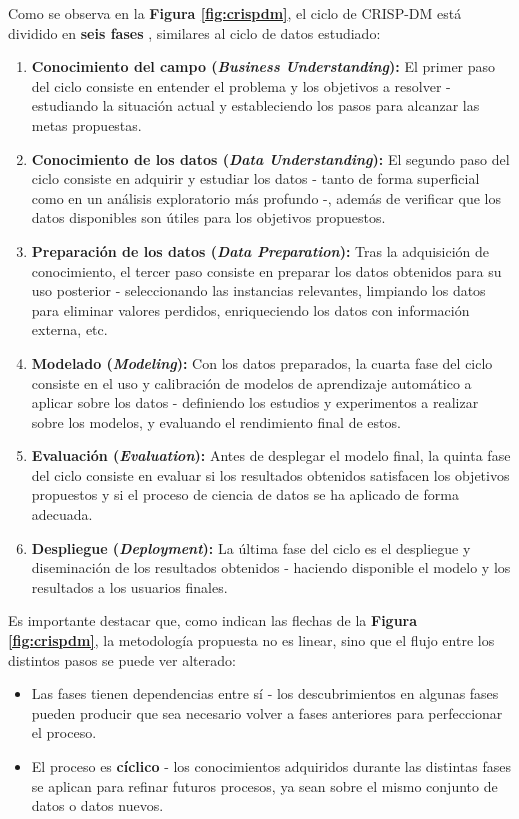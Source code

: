 Como se observa en la \textbf{Figura \ref{fig:crispdm}}, el ciclo de CRISP-DM está dividido en \textbf{seis fases} \cite{shearer2000crisp}, similares al ciclo de datos estudiado:

\begin{enumerate}[parsep=1pt, itemsep=1pt, topsep=4pt]
	\item \textbf{Conocimiento del campo (\textit{Business Understanding}):} El primer paso del ciclo consiste en entender el problema y los objetivos a resolver - estudiando la situación actual y estableciendo los pasos para alcanzar las metas propuestas.
	\item \textbf{Conocimiento de los datos (\textit{Data Understanding}):} El segundo paso del ciclo consiste en adquirir y estudiar los datos - tanto de forma superficial como en un análisis exploratorio más profundo -, además de verificar que los datos disponibles son útiles para los objetivos propuestos.
	\item \textbf{Preparación de los datos (\textit{Data Preparation}):} Tras la adquisición de conocimiento, el tercer paso consiste en preparar los datos obtenidos para su uso posterior - seleccionando las instancias relevantes, limpiando los datos para eliminar valores perdidos, enriqueciendo los datos con información externa, etc.
	\item \textbf{Modelado (\textit{Modeling}):} Con los datos preparados, la cuarta fase del ciclo consiste en el uso y calibración de modelos de aprendizaje automático a aplicar sobre los datos - definiendo los estudios y experimentos a realizar sobre los modelos, y evaluando el rendimiento final de estos.
	\item \textbf{Evaluación (\textit{Evaluation}):} Antes de desplegar el modelo final, la quinta fase del ciclo consiste en evaluar si los resultados obtenidos satisfacen los objetivos propuestos y si el proceso de ciencia de datos se ha aplicado de forma adecuada.
	\item \textbf{Despliegue (\textit{Deployment}):} La última fase del ciclo es el despliegue y diseminación de los resultados obtenidos - haciendo disponible el modelo y los resultados a los usuarios finales.
	
\end{enumerate}

Es importante destacar que, como indican las flechas de la \textbf{Figura \ref{fig:crispdm}}, la metodología propuesta no es linear, sino que el flujo entre los distintos pasos se puede ver alterado:
\begin{itemize}[parsep=1pt, itemsep=1pt, topsep=4pt]
	\item Las fases tienen dependencias entre sí - los descubrimientos en algunas fases pueden producir que sea necesario volver a fases anteriores para perfeccionar el proceso.
	\item El proceso es \textbf{cíclico} - los conocimientos adquiridos durante las distintas fases se aplican para refinar futuros procesos, ya sean sobre el mismo conjunto de datos o datos nuevos.
\end{itemize}

